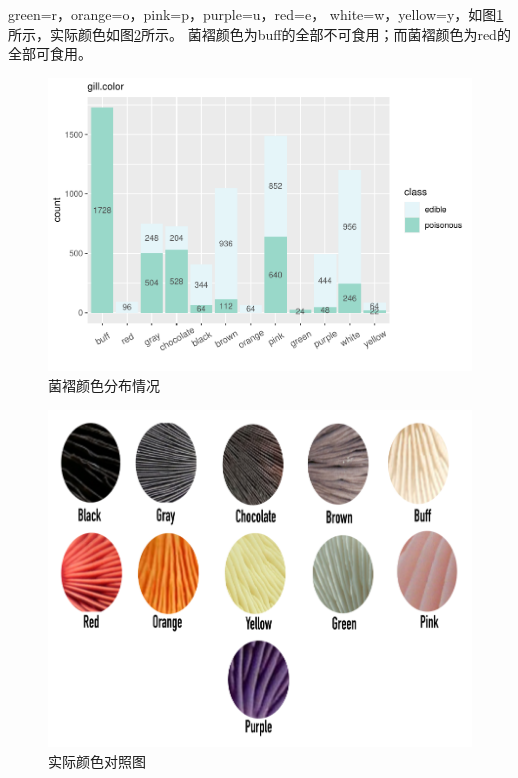 \documentclass[lang=cn,11pt,a4paper,cite=super]{elegantpaper}
\begin{document}
\begin{enumerate}
   green=r，orange=o，pink=p，purple=u，red=e，
   white=w，yellow=y，如图\ref{fig:gillcol}所示，实际颜色如图\ref{fig:truec}所示。
   菌褶颜色为buff的全部不可食用；而菌褶颜色为red的全部可食用。
   \begin{figure}[htb]
      \centering
      \includegraphics[width=0.8\linewidth]{img/gillcolor-1.pdf} 
      \caption{菌褶颜色分布情况}
      \label{fig:gillcol}
   \end{figure}
   \begin{figure}[!hbt]
      \centering
      \includegraphics[width=0.65\linewidth]{img/colortrue.PNG}
      \caption{实际颜色对照图}
      \label{fig:truec}
   \end{figure}


\end{enumerate}
\end{document}
